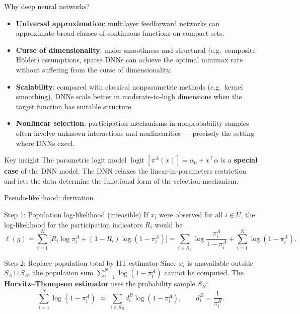 \documentclass[aspectratio=169,11pt]{beamer}
\begin{document}
\begin{frame}{Why deep neural networks?}
\begin{itemize}
  \item \textbf{Universal approximation}: multilayer feedforward networks can approximate broad classes of continuous functions on compact sets.
  \item \textbf{Curse of dimensionality}: under smoothness and structural (e.g.\ composite H\"older) assumptions, sparse DNNs can achieve the optimal minimax rate without suffering from the curse of dimensionality.
  \item \textbf{Scalability}: compared with classical nonparametric methods (e.g.\ kernel smoothing), DNNs scale better in moderate-to-high dimensions when the target function has suitable structure.
  \item \textbf{Nonlinear selection}: participation mechanisms in nonprobability samples often involve unknown interactions and nonlinearities --- precisely the setting where DNNs excel.
\end{itemize}
\vspace{0.05cm}
\begin{block}{Key insight}
The parametric logit model $\operatorname{logit}[\pi^A(x)]=\alpha_0+x^{\top}\alpha$ is a \textbf{special case} of the DNN model. The DNN relaxes the linear-in-parameters restriction and lets the data determine the functional form of the selection mechanism.
\end{block}
\end{frame}

\begin{frame}{Pseudo-likelihood: derivation}
\begin{block}{Step 1: Population log-likelihood (infeasible)}
If $x_i$ were observed for all $i\in U$, the log-likelihood for the participation indicators $R_i$ would be
\[
\ell(g)=\sum_{i=1}^N\bigl[R_i\log\pi_i^A+(1-R_i)\log(1-\pi_i^A)\bigr]
=\sum_{i\in S_A}\log\frac{\pi_i^A}{1-\pi_i^A}+\sum_{i=1}^N\log(1-\pi_i^A).
\]
\end{block}
\begin{block}{Step 2: Replace population total by HT estimator}
Since $x_i$ is unavailable outside $S_A\cup S_B$, the population sum $\sum_{i=1}^N\log(1-\pi_i^A)$ cannot be computed. The \textbf{Horvitz--Thompson estimator} uses the probability sample $S_B$:
\[
\sum_{i=1}^N\log(1-\pi_i^A)\;\approx\;\sum_{i\in S_B}d_i^B\log(1-\pi_i^A),\qquad d_i^B=\frac{1}{\pi_i^B}.
\]
\end{block}
\end{frame}
\end{document}
